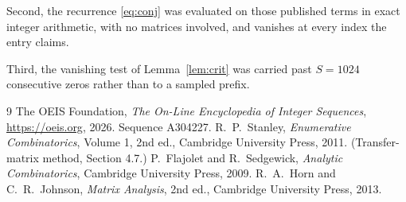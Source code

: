 \documentclass[11pt,a4paper]{article}
\theoremstyle{plain}
\theoremstyle{definition}
\begin{document}
Second, the recurrence \eqref{eq:conj} was evaluated on those published terms in exact
integer arithmetic, with no matrices involved, and vanishes at every index the entry claims.

Third, the vanishing test of Lemma~\ref{lem:crit} was carried past $S=1024$ consecutive
zeros rather than to a sampled prefix.

\begin{thebibliography}{9}
 The OEIS Foundation, \emph{The On-Line Encyclopedia of Integer
Sequences}, \url{https://oeis.org}, 2026. Sequence A304227.
 R.~P.~Stanley, \emph{Enumerative Combinatorics}, Volume 1, 2nd ed.,
Cambridge University Press, 2011. (Transfer-matrix method, Section 4.7.)
 P.~Flajolet and R.~Sedgewick, \emph{Analytic Combinatorics}, Cambridge
University Press, 2009.
 R.~A.~Horn and C.~R.~Johnson, \emph{Matrix Analysis}, 2nd ed., Cambridge
University Press, 2013.
\end{thebibliography}
\end{document}
